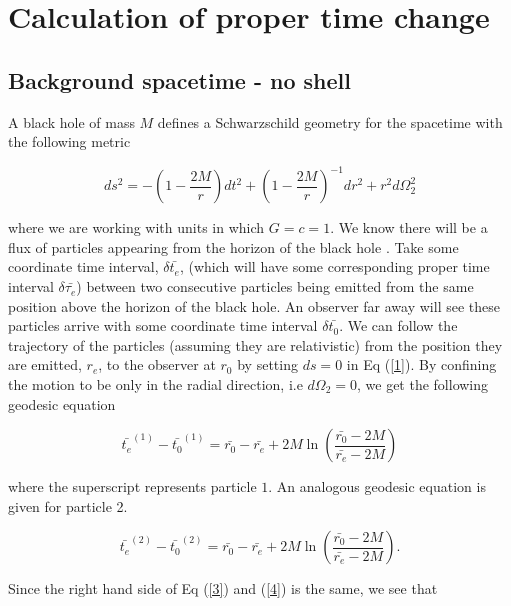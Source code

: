 \documentclass[aps,showpacs,onecolumn,floats,prd,superscriptaddress,nofootinbib]{revtex4-1}
\begin{document}
\appendix

\section{Calculation of proper time change}
\label{Dtime}

\subsection{Background spacetime - no shell}

A black hole of mass $M$ defines a Schwarzschild geometry for the spacetime with the following metric 

\begin{equation}
	ds^2 = - \left( 1 -\frac{2M}{r} \right) dt^2 + \left( 1 - \frac{2M}{r} \right)^{-1} dr^2 + r^2 d \Omega_2^2	\label{1}
\end{equation}

where we are working with units in which $G = c = 1$. We know there will be a flux of particles appearing from the horizon of the black hole \cite{Haw74}. Take some coordinate time interval, $\delta \bar{t_e}$, (which will have some corresponding proper time interval $\delta \bar{\tau_e}$) between two consecutive particles being emitted from the same position above the horizon of the black hole. An observer far away will see these particles arrive with some coordinate time interval $\delta \bar{t_0}$. We can follow the trajectory of the particles (assuming they are relativistic) from the position they are emitted, $r_e$, to the observer at $r_0$ by setting $ds = 0$ in Eq (\ref{1}). By confining the motion to be only in the radial direction, i.e $d \Omega_2 = 0$, we get the following geodesic equation

\begin{equation}
	\bar{t_e}^{(1)} - \bar{t_0}^{(1)} = \bar{r_0} - \bar{r_e} + 2M \ln \left( \frac{\bar{r_0} - 2M}{\bar{r_e} - 2M}  \right)	\label{3}
\end{equation}

where the superscript represents particle $1$. An analogous geodesic equation is given for particle 2. 

\begin{equation}
	\bar{t_e}^{(2)} - \bar{t_0}^{(2)} = \bar{r_0} - \bar{r_e} + 2M \ln \left( \frac{\bar{r_0} - 2M}{\bar{r_e} - 2M}  \right).	\label{4}
\end{equation}

Since the right hand side of Eq (\ref{3}) and (\ref{4}) is the same, we see that
\end{document}

